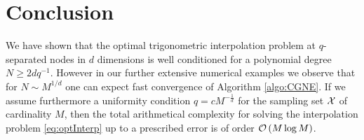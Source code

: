 \documentclass[11pt,a4paper,bibtotoc]{scrartcl}
\numberwithin{equation}{section}
\numberwithin{table}{section}
\numberwithin{figure}{section}
\begin{document}
\section{Conclusion}
We have shown that the optimal trigonometric interpolation problem at
$q$-separated nodes in $d$ dimensions is well conditioned for a polynomial
degree $N \ge 2d q^{-1}$.
However in our further extensive numerical examples we observe that
for $N\sim M^{1/d}$ one can expect fast convergence of Algorithm
\ref{algo:CGNE}. 
If we assume furthermore a uniformity condition $q=c M^{-\frac{1}{d}}$ for the
sampling set ${\cal X}$ of cardinality $M$, then the total
arithmetical complexity for 
solving the interpolation problem \eqref{eq:optInterp} up to a prescribed
error is of order ${\cal O}\left(M \log M \right)$.



%

\end{document}
